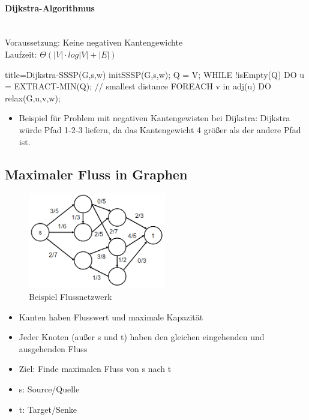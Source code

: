 \documentclass[
    ngerman,
    color=3b,
    dark_mode,
    load_common, %
    summary,
    boxarc,
]{tuda_summary}
\begin{document}
\paragraph{Dijkstra-Algorithmus}\mbox{}\\
Voraussetzung: Keine negativen Kantengewichte\\
Laufzeit: $\Theta(|V| \cdot log|V| + |E|)$
\begin{codeBlock}[autogobble]{title={Dijkstra-SSSP(G,s,w)}}
    initSSSP(G,s,w);
    Q = V;
    WHILE !isEmpty(Q) DO
        u = EXTRACT-MIN(Q);     // smallest distance
        FOREACH v in adj(u) DO
            relax(G,u,v,w);
\end{codeBlock}
\begin{minipage}{.4\textwidth}
    
\end{minipage}
\begin{minipage}{.6\textwidth}
    \begin{itemize}
        \item Beispiel für Problem mit negativen Kantengewisten bei Dijkstra: Dijkstra würde Pfad 1-2-3 liefern, da das Kantengewicht 4 grö\ss{}er als der andere Pfad ist.
    \end{itemize}
\end{minipage}

\clearpage
\subsection{Maximaler Fluss in Graphen}\mbox{}\vspace{-2em}
\begin{figure}
    \includegraphics[width=6cm]{pictures/flussIdee.PNG}
    \caption{Beispiel Flussnetzwerk}
\end{figure}
\begin{idea}\mbox{}
    \begin{itemize}
        \item Kanten haben Flusswert und maximale Kapazität
        \item Jeder Knoten (au\ss{}er s und t) haben den gleichen eingehenden und ausgehenden Fluss
        \item Ziel: Finde maximalen Fluss von s nach t
        \item s: Source/Quelle
        \item t: Target/Senke
    \end{itemize}
\end{idea}
\end{document}
